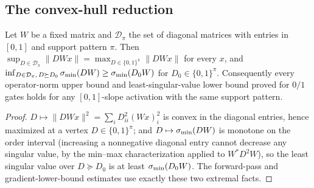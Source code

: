 \subsection{The convex-hull reduction}
\begin{lemma}\label{lem:hull}
Let $W$ be a fixed matrix and $\mathcal D_\pi$ the set of diagonal matrices with entries in $[0,1]$ and
support pattern $\pi$. Then $\sup_{D\in\mathcal D_\pi}\|DWx\|=\max_{D\in\{0,1\}^\pi}\|DWx\|$ for every $x$,
and $\inf_{D\in\mathcal D_\pi,\,D\succeq D_0}\sigma_{\min}(DW)\ge\sigma_{\min}(D_0W)$ for $D_0\in\{0,1\}^\pi$. Consequently
every operator-norm upper bound and least-singular-value lower bound proved for $0/1$ gates holds for any
$[0,1]$-slope activation with the same support pattern.
\end{lemma}
\begin{proof}
$D\mapsto\|DWx\|^2=\sum_i D_{ii}^2(Wx)_i^2$ is convex in the diagonal entries, hence maximized at a vertex
$D\in\{0,1\}^\pi$; and $D\mapsto\sigma_{\min}(DW)$ is monotone on the order interval (increasing a nonnegative
diagonal entry cannot decrease any singular value, by the min--max characterization applied to $W^*D^2W$),
so the least singular value over $D\succeq D_0$ is at least $\sigma_{\min}(D_0W)$. The forward-pass and
gradient-lower-bound estimates use exactly these two extremal facts.
\end{proof}
